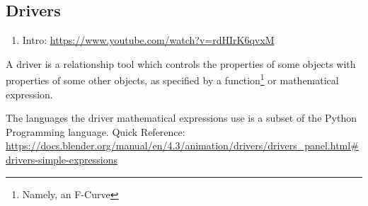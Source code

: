 \documentclass{article}
\begin{document}
\subsection{Drivers}
\begin{enumerate}[noitemsep, topsep=0pt]
    \item Intro: \href{https://www.youtube.com/watch?v=rdHIrK6qvxM}{https://www.youtube.com/watch?v=rdHIrK6qvxM}
\end{enumerate}
A driver is a relationship tool which controls the properties of some objects with properties of some other objects, as specified by a function\footnote{Namely, an F-Curve} or mathematical expression.\par
The languages the driver mathematical expressions use is a subset of the Python Programming language. Quick Reference: \url{https://docs.blender.org/manual/en/4.3/animation/drivers/drivers_panel.html#drivers-simple-expressions}\par
\noindent
\end{document}
